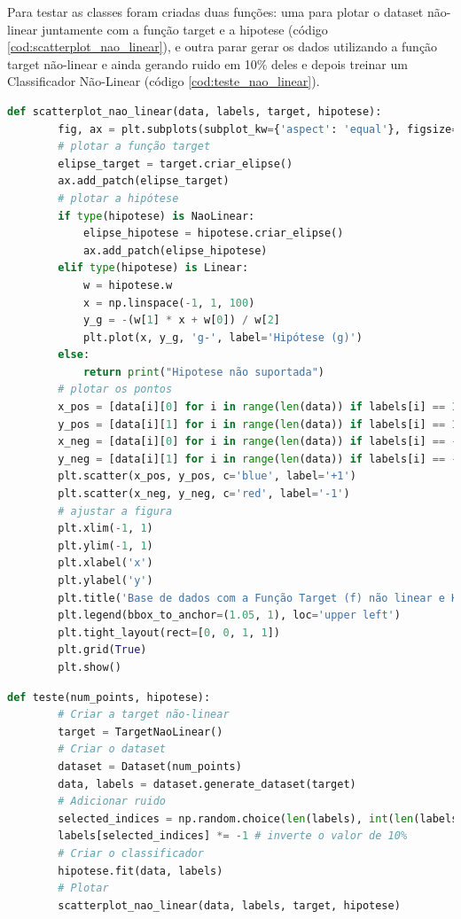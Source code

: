 Para testar as classes foram criadas duas funções: uma para plotar o dataset não-linear juntamente com a função target e a hipotese (código \ref{cod:scatterplot_nao_linear}), e outra parar gerar os dados utilizando a função target não-linear e ainda gerando ruido em 10\% deles e depois treinar um Classificador Não-Linear (código \ref{cod:teste_nao_linear}).

\begin{lstlisting}[language=Python, caption=Scatterplot Não-Linear, label=cod:scatterplot_nao_linear]
    def scatterplot_nao_linear(data, labels, target, hipotese):
        fig, ax = plt.subplots(subplot_kw={'aspect': 'equal'}, figsize=(8, 6))
        # plotar a função target
        elipse_target = target.criar_elipse()
        ax.add_patch(elipse_target)
        # plotar a hipótese
        if type(hipotese) is NaoLinear:
            elipse_hipotese = hipotese.criar_elipse()
            ax.add_patch(elipse_hipotese)
        elif type(hipotese) is Linear:
            w = hipotese.w
            x = np.linspace(-1, 1, 100)
            y_g = -(w[1] * x + w[0]) / w[2]
            plt.plot(x, y_g, 'g-', label='Hipótese (g)')
        else:
            return print("Hipotese não suportada")
        # plotar os pontos
        x_pos = [data[i][0] for i in range(len(data)) if labels[i] == 1]
        y_pos = [data[i][1] for i in range(len(data)) if labels[i] == 1]
        x_neg = [data[i][0] for i in range(len(data)) if labels[i] == -1]
        y_neg = [data[i][1] for i in range(len(data)) if labels[i] == -1]
        plt.scatter(x_pos, y_pos, c='blue', label='+1')
        plt.scatter(x_neg, y_neg, c='red', label='-1')
        # ajustar a figura       
        plt.xlim(-1, 1)
        plt.ylim(-1, 1)
        plt.xlabel('x')
        plt.ylabel('y')
        plt.title('Base de dados com a Função Target (f) não linear e Hipótese (g)')
        plt.legend(bbox_to_anchor=(1.05, 1), loc='upper left')
        plt.tight_layout(rect=[0, 0, 1, 1])
        plt.grid(True)
        plt.show()
\end{lstlisting}

\begin{lstlisting}[language=Python, caption=Teste para a Regressão Não-Linear, label=cod:teste_nao_linear]
    def teste(num_points, hipotese):
        # Criar a target não-linear
        target = TargetNaoLinear()
        # Criar o dataset
        dataset = Dataset(num_points)
        data, labels = dataset.generate_dataset(target)
        # Adicionar ruido
        selected_indices = np.random.choice(len(labels), int(len(labels) * 0.1), replace=False) # seleciona 10%
        labels[selected_indices] *= -1 # inverte o valor de 10%
        # Criar o classificador
        hipotese.fit(data, labels)
        # Plotar
        scatterplot_nao_linear(data, labels, target, hipotese)
\end{lstlisting}

